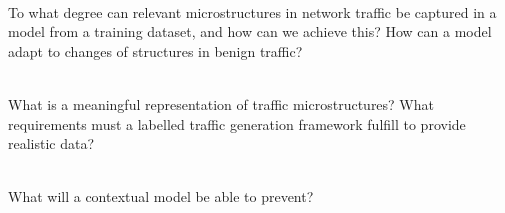 \begin{rquestion}\ \\
To what degree can relevant microstructures in network traffic be captured in a model from a training dataset, and how can we achieve this? How can a model adapt to changes of structures in benign traffic?
\end{rquestion}

\begin{rquestion}\ \\
What is a meaningful representation of traffic microstructures? What requirements must a labelled traffic generation framework fulfill to provide realistic data?
\end{rquestion}


\begin{rquestion}\ \\
What will a contextual model be able to prevent? 
\end{rquestion}



